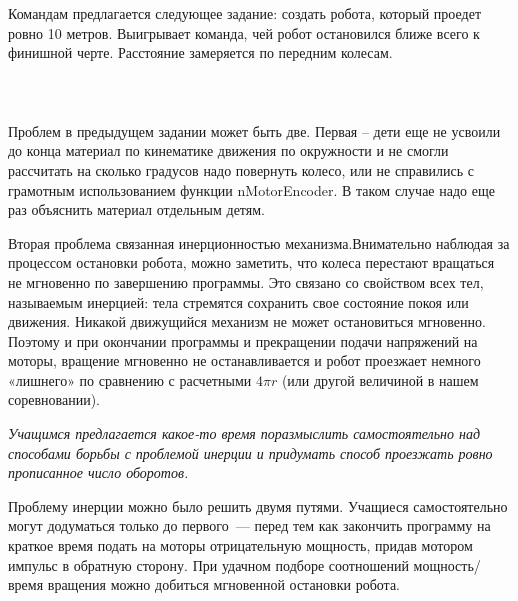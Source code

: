 {\hypertarget{lesson10x3}{}}\\\\

Командам предлагается следующее задание: создать   робота,  который проедет ровно 10 метров. Выигрывает команда, чей робот остановился ближе всего к финишной черте. Расстояние замеряется по передним колесам.\\\\

{\hypertarget{lesson10x4}{}}\\\\

Проблем в предыдущем задании может быть две. Первая – дети еще не усвоили до конца материал по кинематике движения по окружности и не смогли рассчитать на сколько градусов надо повернуть колесо, или не справились с грамотным использованием функции nMotorEncoder. В таком случае надо еще раз объяснить материал отдельным детям.

Вторая проблема связанная инерционностью механизма.Внимательно наблюдая за процессом остановки робота, можно заметить, что колеса перестают вращаться не мгновенно по завершению программы. Это связано со свойством всех тел, называемым инерцией: тела стремятся сохранить свое состояние покоя или движения. Никакой движущийся механизм не может остановиться мгновенно. Поэтому и при окончании  программы и прекращении подачи напряжений на моторы, вращение мгновенно не  останавливается и робот проезжает немного «лишнего» по сравнению с расчетными \(4\pi r\) (или другой величиной в нашем соревновании).

{\slshape Учащимся предлагается  какое-то время поразмыслить самостоятельно над способами борьбы с  проблемой инерции и придумать способ проезжать ровно прописанное число оборотов.}

Проблему инерции можно было решить двумя путями. Учащиеся самостоятельно могут додуматься только до первого~--- перед тем как закончить программу на краткое время подать на моторы отрицательную мощность, придав мотором импульс в обратную сторону. При удачном подборе соотношений мощность/время вращения можно добиться мгновенной остановки робота.\\\\

